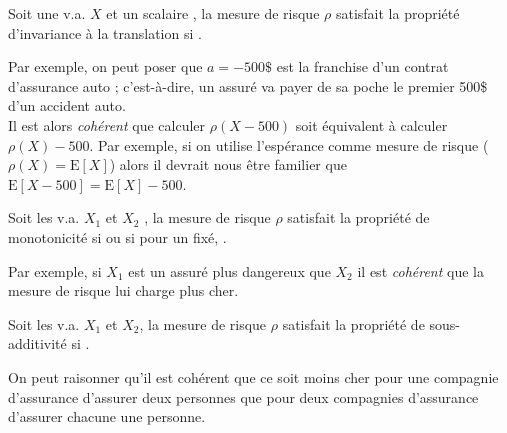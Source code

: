 \documentclass[10pt, french]{article}
\begin{document}
\begin{multicols*}{2}
\begin{definitionNOHFILLsub}
Soit une v.a. $X$ et un scalaire , la mesure de risque $\rho$ satisfait la propriété d'invariance à la translation si .	\\

\begin{rappel_enhanced}[Interprétation]
Par exemple, on peut poser que $a	=	-500\$$ est la franchise d'un contrat d'assurance auto ; c'est-à-dire, un assuré va payer de sa poche le premier 500\$ d'un accident auto.\\

Il est alors \textit{cohérent} que calculer $\rho(X - 500)$ soit équivalent à calculer $\rho(X) - 500$. Par exemple, si on utilise l'espérance comme mesure de risque ($\rho(X)	=	\text{E}[X]$) alors  il devrait nous être familier que $\text{E}[X	-	500]	=	\text{E}[X]	-	500$.
\end{rappel_enhanced}
\end{definitionNOHFILLsub}

\begin{definitionNOHFILLsub}[Monotonicité]
Soit les v.a. $X_{1}$ et $X_{2}$ , la mesure de risque $\rho$ satisfait la propriété de monotonicité si  ou si pour un  fixé, .\\

\begin{rappel_enhanced}[Interprétation]
Par exemple, si $X_{1}$ est un assuré plus dangereux que $X_{2}$ il est \textit{cohérent} que la mesure de risque lui charge plus cher.
\end{rappel_enhanced}
\end{definitionNOHFILLsub}

\begin{definitionNOHFILLsub}
Soit les v.a. $X_{1}$ et $X_{2}$, la mesure de risque $\rho$ satisfait la propriété de sous-additivité si .\\

\begin{rappel_enhanced}[Interprétation]
On peut raisonner qu'il est cohérent que ce soit moins cher pour une compagnie d'assurance d’assurer deux personnes que pour deux compagnies d'assurance d’assurer chacune une personne.
\end{rappel_enhanced}
\end{definitionNOHFILLsub}



\end{multicols*}
\end{document}
